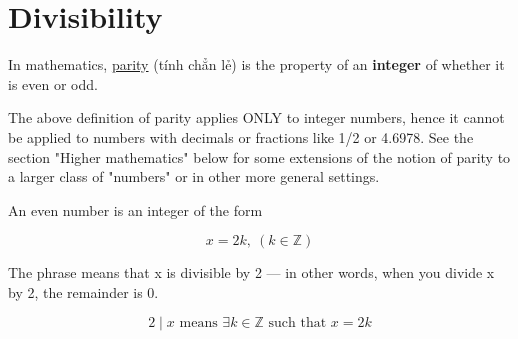 \section{Divisibility}

In mathematics, \href{https://en.wikipedia.org/wiki/Parity_%28mathematics%29}{parity} (tính chẳn lẻ) is the property of an \textbf{integer} of whether it is even or odd.

The above definition of parity applies ONLY to integer numbers, hence it cannot be applied to numbers with decimals or fractions like 1/2 or 4.6978. See the section "Higher mathematics" below for some extensions of the notion of parity to a larger class of "numbers" or in other more general settings. 

An even number is an integer of the form

\[x=2k,\ (k \in \mathbb{Z})\]

The phrase  means that x is divisible by 2 — in other words, when you divide x by 2, the remainder is 0.

\[2 \mid x \text{ means } \exists k \in \mathbb{Z} \text{ such that } x = 2k\]
